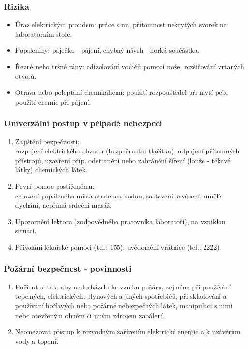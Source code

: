 \documentclass{beamer}
\begin{document}
	\begin{frame}
    \frametitle{Rizika}
		\begin{itemize}
		\item Úraz elektrickým proudem: práce s nn, přítomnost nekrytých svorek na laboratorním stole.
		\item Popáleniny: páječka - pájení, chybný návrh - horká součástka.
		\item Řezné nebo tržné rány: odizolování vodičů pomocí nože, rozšiřování vrtaných otvorů.
		\item Otrava nebo poleptání chemikáliemi: použití rozpouštědel při mytí pcb, použití chemie při pájení.
		\end{itemize}
	\end{frame}
	\begin{frame}
    \frametitle{Univerzální postup v případě nebezpečí}
		\begin{enumerate}
		\item Zajištění bezpečnosti:\\
		rozpojení elektrického obvodu (bezpečnostní tlačítka), odpojení přítomných přístrojů, uzavření příp. odstranění nebo zabránění šíření (louže - těkavé látky) chemických látek.
		\item První pomoc postiženému:\\ chlazení popáleného místa studenou vodou, zastavení krvácení, umělé dýchání, nepřímá srdeční masáž.
		\item Upozornění lektora (zodpovědného pracovníka laboratoří), na vzniklou situaci.
		\item Přivolání lékařské pomoci (tel.: 155), uvědomění vrátnice (tel.: 2222).
		\end{enumerate}
	\end{frame}
	\begin{frame}
    \frametitle{Požární bezpečnost - povinnosti}
		\begin{enumerate}
		\item Počínat si tak, aby nedocházelo ke vzniku požáru, zejména při používání tepelných, elektrických, plynových a jiných spotřebičů, při skladování a používání hořlavých nebo požárně nebezpečných látek, manipulaci s nimi nebo otevřeným ohněm či jiným zdrojem zapálení.
		\item Neomezovat přístup k rozvodným zařízením elektrické energie a k uzávěrům vody a topení.
		\end{enumerate}
	\end{frame}
\end{document}
